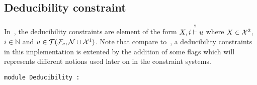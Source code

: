 \subsection{Deducibility constraint}




In~\thesis, the deducibility constraints are element of the form $X, i \stackrel{?}{\vdash} u$ where 
    $X \in \mathcal{X}^2$, $i \in \mathbb{N}$ and $u \in \mathcal{T}(\mathcal{F}_c, \mathcal{N} \cup \mathcal{X}^1)$.
    Note that compare to~\thesis, a deducibility constraints in this implementation is
    extented by the addition of some flags which will represents different notions used 
    later on in the constraint systems. 



\begin{ocamldoccode}
{\tt{module }}{\tt{Deducibility}}{\tt{ : }}\end{ocamldoccode}
\label{module:Constraint.Deducibility}


